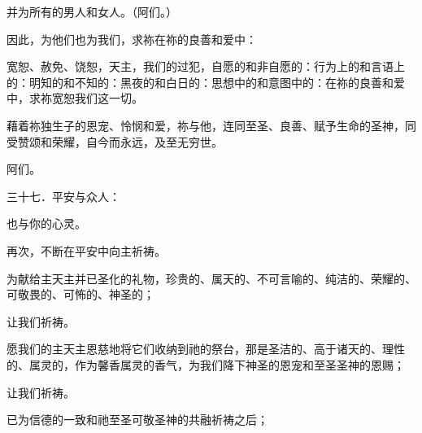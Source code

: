 \par

并为所有的男人和女人。（阿们。）\par

\par

因此，为他们也为我们，求祢在祢的良善和爱中：\par

\par

宽恕、赦免、饶恕，天主，我们的过犯，自愿的和非自愿的：行为上的和言语上的：明知的和不知的：黑夜的和白日的：思想中的和意图中的：在祢的良善和爱中，求祢宽恕我们这一切。\par

\par

藉着祢独生子的恩宠、怜悯和爱，祢与他，连同至圣、良善、赋予生命的圣神，同受赞颂和荣耀，自今而永远，及至无穷世。\par

\par

阿们。\par

\par

三十七．平安与众人：\par

\par

也与你的心灵。\par

\par

再次，不断在平安中向主祈祷。\par

为献给主天主并已圣化的礼物，珍贵的、属天的、不可言喻的、纯洁的、荣耀的、可敬畏的、可怖的、神圣的；\par

让我们祈祷。\par

愿我们的主天主恩慈地将它们收纳到祂的祭台，那是圣洁的、高于诸天的、理性的、属灵的，作为馨香属灵的香气，为我们降下神圣的恩宠和至圣圣神的恩赐；\par

让我们祈祷。\par

已为信德的一致和祂至圣可敬圣神的共融祈祷之后；\par

